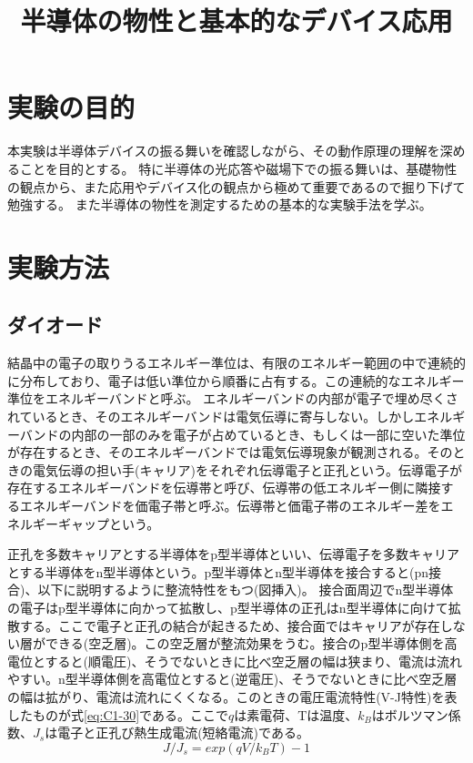 \documentclass[11pt,a4]{jarticle}
\begin{document}
\title{半導体の物性と基本的なデバイス応用}
\maketitle
\tableofcontents

\section{実験の目的}
本実験は半導体デバイスの振る舞いを確認しながら、その動作原理の理解を深めることを目的とする。
特に半導体の光応答や磁場下での振る舞いは、基礎物性の観点から、また応用やデバイス化の観点から極めて重要であるので掘り下げて勉強する。
また半導体の物性を測定するための基本的な実験手法を学ぶ。
\section{実験方法}

\subsection{ダイオード}
結晶中の電子の取りうるエネルギー準位は、有限のエネルギー範囲の中で連続的に分布しており、電子は低い準位から順番に占有する。この連続的なエネルギー準位をエネルギーバンドと呼ぶ。
エネルギーバンドの内部が電子で埋め尽くされているとき、そのエネルギーバンドは電気伝導に寄与しない。しかしエネルギーバンドの内部の一部のみを電子が占めているとき、もしくは一部に空いた準位が存在するとき、そのエネルギーバンドでは電気伝導現象が観測される。そのときの電気伝導の担い手(キャリア)をそれぞれ伝導電子と正孔という。伝導電子が存在するエネルギーバンドを伝導帯と呼び、伝導帯の低エネルギー側に隣接するエネルギーバンドを価電子帯と呼ぶ。伝導帯と価電子帯のエネルギー差をエネルギーギャップという。

正孔を多数キャリアとする半導体をp型半導体といい、伝導電子を多数キャリアとする半導体をn型半導体という。p型半導体とn型半導体を接合すると(pn接合)、以下に説明するように整流特性をもつ(図挿入)。
接合面周辺でn型半導体の電子はp型半導体に向かって拡散し、p型半導体の正孔はn型半導体に向けて拡散する。ここで電子と正孔の結合が起きるため、接合面ではキャリアが存在しない層ができる(空乏層)。この空乏層が整流効果をうむ。接合のp型半導体側を高電位とすると(順電圧)、そうでないときに比べ空乏層の幅は狭まり、電流は流れやすい。n型半導体側を高電位とすると(逆電圧)、そうでないときに比べ空乏層の幅は拡がり、電流は流れにくくなる。このときの電圧電流特性(V-J特性)を表したものが式\ref{eq:C1-30}である。ここで$q$は素電荷、Tは温度、$k_B$はボルツマン係数、$J_s$は電子と正孔び熱生成電流(短絡電流)である。
\begin{equation}
J / J_s = exp(qV/ k_B T)- 1
\label{eq:C1-30}
\end{equation}
\end{document}
